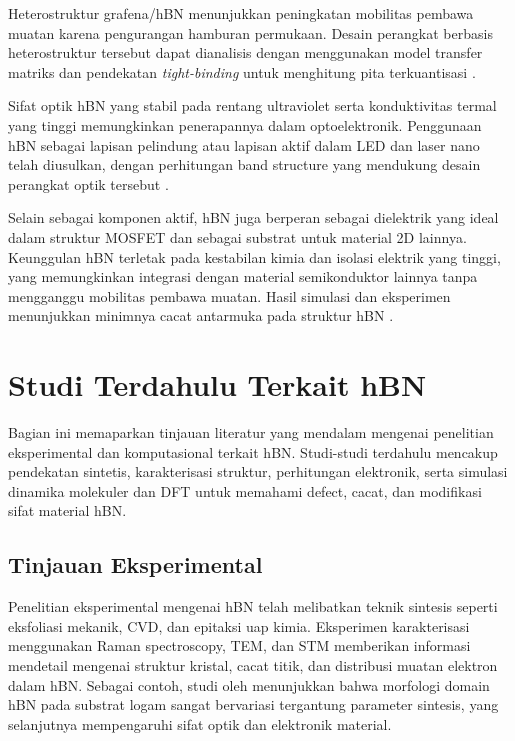 Heterostruktur grafena/hBN menunjukkan peningkatan mobilitas pembawa muatan karena pengurangan hamburan permukaan. Desain perangkat berbasis heterostruktur tersebut dapat dianalisis dengan menggunakan model transfer matriks dan pendekatan \emph{tight-binding} untuk menghitung pita terkuantisasi \citep{castro_neto_electronic_2009}.
 
Sifat optik hBN yang stabil pada rentang ultraviolet serta konduktivitas termal yang tinggi memungkinkan penerapannya dalam optoelektronik. Penggunaan hBN sebagai lapisan pelindung atau lapisan aktif dalam LED dan laser nano telah diusulkan, dengan perhitungan band structure yang mendukung desain perangkat optik tersebut \citep{garcia_defect_2015}.

Selain sebagai komponen aktif, hBN juga berperan sebagai dielektrik yang ideal dalam struktur MOSFET dan sebagai substrat untuk material 2D lainnya. Keunggulan hBN terletak pada kestabilan kimia dan isolasi elektrik yang tinggi, yang memungkinkan integrasi dengan material semikonduktor lainnya tanpa mengganggu mobilitas pembawa muatan. Hasil simulasi dan eksperimen menunjukkan minimnya cacat antarmuka pada struktur hBN \citep{bhimanapati_2d_2015}.

\section{Studi Terdahulu Terkait hBN}
Bagian ini memaparkan tinjauan literatur yang mendalam mengenai penelitian eksperimental dan komputasional terkait hBN. Studi-studi terdahulu mencakup pendekatan sintetis, karakterisasi struktur, perhitungan elektronik, serta simulasi dinamika molekuler dan DFT untuk memahami defect, cacat, dan modifikasi sifat material hBN.

\subsection{Tinjauan Eksperimental}
Penelitian eksperimental mengenai hBN telah melibatkan teknik sintesis seperti eksfoliasi mekanik, CVD, dan epitaksi uap kimia. Eksperimen karakterisasi menggunakan Raman spectroscopy, TEM, dan STM memberikan informasi mendetail mengenai struktur kristal, cacat titik, dan distribusi muatan elektron dalam hBN. Sebagai contoh, studi oleh \citep{bhimanapati_2d_2015} menunjukkan bahwa morfologi domain hBN pada substrat logam sangat bervariasi tergantung parameter sintesis, yang selanjutnya mempengaruhi sifat optik dan elektronik material.
  
